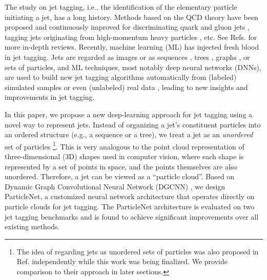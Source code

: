 \documentclass[aps,prd,longbibliography,reprint,amsmath,amssymb,amsfonts]{revtex4-1}
\begin{document}
The study on jet tagging, i.e., the identification of the elementary particle initiating a jet, has a long history. Methods based on the QCD theory have been proposed and continuously improved for discriminating quark and gluon jets \cite{Gallicchio:2011xq,Gallicchio:2012ez,Larkoski:2014pca,Bhattacherjee:2015psa,FerreiradeLima:2016gcz,Gras:2017jty,Frye:2017yrw}, tagging jets originating from high-momentum heavy particles \cite{Kaplan:2008ie,Cui:2010km,Plehn:2011sj,Soper:2012pb,Anders:2013oga,Kasieczka:2015jma,Thaler:2010tr,Thaler:2011gf,Larkoski:2013eya,Moult:2016cvt,Larkoski:2014wba}, etc. See Refs. \cite{Abdesselam:2010pt,Altheimer:2012mn,Altheimer:2013yza,Adams:2015hiv,Larkoski:2017jix,Asquith:2018igt} for more in-depth reviews. Recently, machine learning (ML) has injected fresh blood in jet tagging. Jets are regarded as images \cite{Cogan:2014oua,Almeida:2015jua,deOliveira:2015xxd,Baldi:2016fql,Barnard:2016qma,Komiske:2016rsd,ATL-PHYS-PUB-2017-017,Kasieczka:2017nvn,Macaluso:2018tck,Choi:2018dag,Dreyer:2018nbf} or as sequences \cite{Guest:2016iqz,Pearkes:2017hku,Egan:2017ojy,Fraser:2018ieu,CMS-DP-2017-013,CMS-DP-2018-058,CMS-DP-2017-049,stoye2017deepjet,CMS-PAS-JME-18-002,ATL-PHYS-PUB-2017-003,Butter:2017cot,Kasieczka:2018lwf,Erdmann:2018shi}, trees \cite{Louppe:2017ipp,Cheng:2017rdo}, graphs \cite{henrionneural}, or sets \cite{Komiske:2018cqr} of particles, and ML techniques, most notably deep neural networks (DNNs), are used to build new jet tagging algorithms automatically from (labeled) simulated samples or even (unlabeled) real data \cite{Metodiev:2017vrx,Komiske:2018oaa,Andreassen:2018apy,Komiske:2018vkc}, leading to new insights and improvements in jet tagging. 

In this paper, we propose a new deep-learning approach for jet tagging using a novel way to represent jets. Instead of organizing a jet's constituent particles into an ordered structure (e.g., a sequence or a tree), we treat a jet as an \textit{unordered} set of particles \footnote{The idea of regarding jets as unordered sets of particles was also proposed in Ref. \cite{Komiske:2018cqr} independently while this work was being finalized. We provide comparison to their approach in later sections.}. This is very analogous to the point cloud representation of three-dimensional (3D) shapes used in computer vision, where each shape is represented by a set of points in space, and the points themselves are also unordered. Therefore, a jet can be viewed as a ``particle cloud''. Based on Dynamic Graph Convolutional Neural Network (DGCNN) \cite{DBLP:journals/corr/abs-1801-07829}, we design ParticleNet, a customized neural network architecture that operates directly on particle clouds for jet tagging. The ParticleNet architecture is evaluated on two jet tagging benchmarks and is found to achieve significant improvements over all existing methods.
\end{document}
